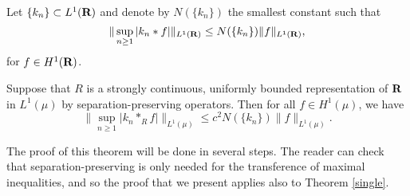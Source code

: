 Let $\{k_n\}\subset L^1(\R)$ and denote by 
$N(\{k_n\})$ the smallest constant
such that
$$ \|\sup_{n\geq 1} |k_n*f|\|_{L^1(\R)}\leq N(\{k_n\})
\|f\|_{L^1(\R)},$$
for $f\in H^1(\R)$.  
\begin{main-theorem}
Suppose that $R$ is a strongly continuous, uniformly 
bounded representation of $\R$ in $L^1(\mu)$ by 
separation-preserving operators.  Then for all $f\in H^1(\mu)$, we have
\begin{equation}
\|\sup_{n\geq 1} |k_n*_Rf|\|_{L^1(\mu)}\leq
c^2 N(\{k_n\}) \|f\|_{L^1(\mu)}.
\label{main-inequality}
\end{equation}
\label{main-theorem}
\end{main-theorem}
The proof of this theorem will be done in
several steps.  The reader can check that 
separation-preserving is only needed for the 
transference of maximal inequalities, and so
the proof that we present applies also to Theorem
\ref{single}.
 
